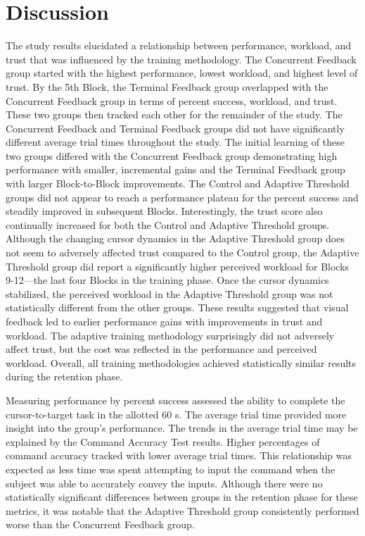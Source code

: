 \section{Discussion}
The study results elucidated a relationship between performance, workload, and trust that was influenced by the training methodology.
The Concurrent Feedback group started with the highest performance, lowest workload, and highest level of trust.
By the 5th Block, the Terminal Feedback group overlapped with the Concurrent Feedback group in terms of percent success, workload, and trust.
These two groups then tracked each other for the remainder of the study.
The Concurrent Feedback and Terminal Feedback groups did not have significantly different average trial times throughout the study.
The initial learning of these two groups differed with the Concurrent Feedback group demonstrating high performance with smaller, incremental gains and the Terminal Feedback group with larger Block-to-Block improvements.
The Control and Adaptive Threshold groups did not appear to reach a performance plateau for the percent success and steadily improved in subsequent Blocks.
Interestingly, the trust score also continually increased for both the Control and Adaptive Threshold groups.
Although the changing cursor dynamics in the Adaptive Threshold group does not seem to adversely affected trust compared to the Control group, the Adaptive Threshold group did report a significantly higher perceived workload for Blocks 9-12---the last four Blocks in the training phase.
Once the cursor dynamics stabilized, the perceived workload in the Adaptive Threshold group was not statistically different from the other groups.
These results suggested that visual feedback led to earlier performance gains with improvements in trust and workload.
The adaptive training methodology surprisingly did not adversely affect trust, but the cost was reflected in the performance and perceived workload.
Overall, all training methodologies achieved statistically similar results during the retention phase.

Measuring performance by percent success assessed the ability to complete the cursor-to-target task in the allotted 60 s.
The average trial time provided more insight into the group's performance.
The trends in the average trial time may be explained by the Command Accuracy Test results.
Higher percentages of command accuracy tracked with lower average trial times.
This relationship was expected as less time was spent attempting to input the command when the subject was able to accurately convey the inputs.
Although there were no statistically significant differences between groups in the retention phase for these metrics, it was notable that the Adaptive Threshold group consistently performed worse than the Concurrent Feedback group.

